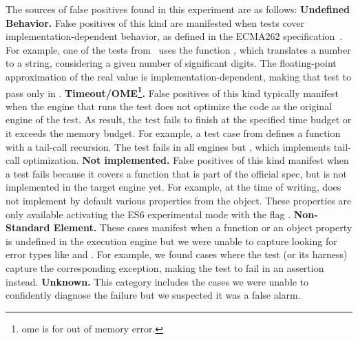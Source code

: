 \documentclass[10pt,conference,anonymous]{IEEEtran}
\begin{document}

The sources of false positives found in this experiment are as
follows: \textbf{Undefined Behavior.} False positives of this kind are
manifested when tests cover implementation-dependent behavior, as
defined in the ECMA262 specification~\cite{ecmas262-spec}. For
example, one of the tests from \jerry\ uses the function
, which translates a number to
a string, considering a given number of significant digits. The
floating-point approximation of the real value is
implementation-dependent, making that test to pass only in
\chakra. \textbf{Timeout/OME\footnote{ome is for out of memory
    error.}.} False positives of this kind typically manifest when the
engine that runs the test does not optimize the code as the original
engine of the test. As result, the test fails to finish at the
specified time budget or it exceeds the memory budget. For example, a
test case from \jsc{} defines a function with a tail-call
recursion. The test fails in all engines but \jsc{}, which implements
tail-call optimization. \textbf{Not implemented.} False positives of
this kind manifest when a test fails because it covers a function that
is part of the official spec, but is not implemented in the target
engine yet. For example, at the time of writing, \chakra{} does not
implement by default various properties from the 
object. These properties are only available activating the ES6
experimental mode with the flag .
\textbf{Non-Standard Element.} These cases manifest when a function or
an object property is undefined in the execution engine but we were
unable to capture looking for error types like 
and . For example, we found cases where the test (or
its harness) capture the corresponding exception, making the test to
fail in an assertion instead. 
    \textbf{Unknown.} This category
includes the cases we were unable to confidently diagnose the failure
but we suspected it was a false alarm.
\end{document}

